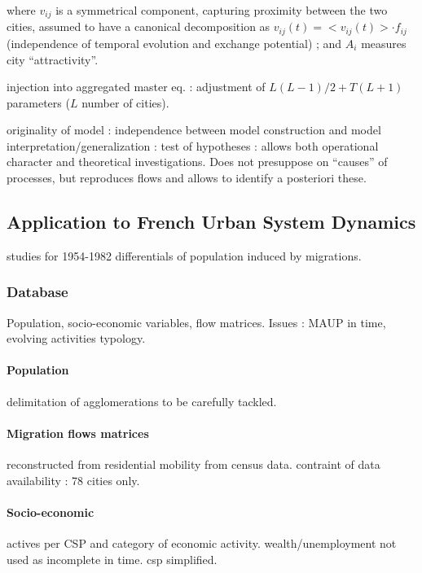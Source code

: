 where $v_{ij}$ is a symmetrical component, capturing proximity between the two cities, assumed to have a canonical decomposition as $v_{ij}(t) = <v_{ij}(t)>\cdot f_{ij}$ (independence of temporal evolution and exchange potential) ; and $A_i$ measures city ``attractivity''.

injection into aggregated master eq. : adjustment of $L(L-1)/2 + T(L+1)$ parameters ($L$ number of cities).

originality of model : independence between model construction and model interpretation/generalization : test of hypotheses : allows both operational character and theoretical investigations. Does not presuppose on ``causes'' of processes, but reproduces flows and allows to identify a posteriori these.




\subsection{Application to French Urban System Dynamics}

studies for 1954-1982 differentials of population induced by migrations.

\subsubsection{Database}

Population, socio-economic variables, flow matrices. Issues : MAUP in time, evolving activities typology.

\paragraph{Population}

delimitation of agglomerations to be carefully tackled.

\paragraph{Migration flows matrices}

reconstructed from residential mobility from census data. contraint of data availability : 78 cities only.

\paragraph{Socio-economic}

actives per CSP and category of economic activity. wealth/unemployment not used as incomplete in time. csp simplified.

